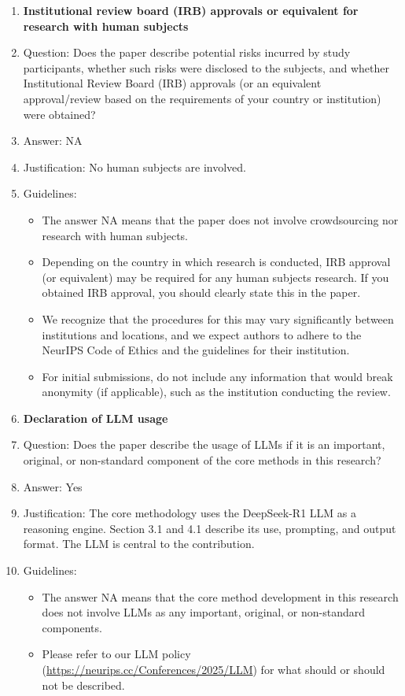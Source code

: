 \documentclass{article}
\newcommand{\answerYes}[1][]{Yes}
\newcommand{\answerNA}[1][]{NA}
\begin{document}
\begin{enumerate}
\item {\bf Institutional review board (IRB) approvals or equivalent for research with human subjects}
    \item[] Question: Does the paper describe potential risks incurred by study participants, whether such risks were disclosed to the subjects, and whether Institutional Review Board (IRB) approvals (or an equivalent approval/review based on the requirements of your country or institution) were obtained?
    \item[] Answer: \answerNA{}
    \item[] Justification: No human subjects are involved.
    \item[] Guidelines:
    \begin{itemize}
        \item The answer NA means that the paper does not involve crowdsourcing nor research with human subjects.
        \item Depending on the country in which research is conducted, IRB approval (or equivalent) may be required for any human subjects research. If you obtained IRB approval, you should clearly state this in the paper. 
        \item We recognize that the procedures for this may vary significantly between institutions and locations, and we expect authors to adhere to the NeurIPS Code of Ethics and the guidelines for their institution. 
        \item For initial submissions, do not include any information that would break anonymity (if applicable), such as the institution conducting the review.
    \end{itemize}

\item {\bf Declaration of LLM usage}
    \item[] Question: Does the paper describe the usage of LLMs if it is an important, original, or non-standard component of the core methods in this research? 
    \item[] Answer: \answerYes{}
    \item[] Justification: The core methodology uses the DeepSeek-R1 LLM as a reasoning engine. Section 3.1 and 4.1 describe its use, prompting, and output format. The LLM is central to the contribution.
    \item[] Guidelines:
    \begin{itemize}
        \item The answer NA means that the core method development in this research does not involve LLMs as any important, original, or non-standard components.
        \item Please refer to our LLM policy (\url{https://neurips.cc/Conferences/2025/LLM}) for what should or should not be described.
    \end{itemize}

\end{enumerate}
\end{document}
